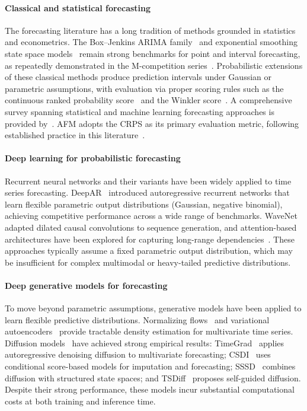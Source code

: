 \documentclass[a4paper,10pt,twocolumn,preprint,3p]{elsarticle}
\begin{document}
{\color{red}
\paragraph{Classical and statistical forecasting}
The forecasting literature has a long tradition of methods grounded in statistics and econometrics. The Box--Jenkins ARIMA family~\citep{Box1994Timeseries} and exponential smoothing state space models~\citep{hyndman2008forecasting} remain strong benchmarks for point and interval forecasting, as repeatedly demonstrated in the M-competition series~\citep{makridakis2020m4}. Probabilistic extensions of these classical methods produce prediction intervals under Gaussian or parametric assumptions, with evaluation via proper scoring rules such as the continuous ranked probability score~\citep{gneiting2007strictly} and the Winkler score~\citep{winkler1996scoring}. A comprehensive survey spanning statistical and machine learning forecasting approaches is provided by~\citet{petropoulos2022forecasting}. AFM adopts the CRPS as its primary evaluation metric, following established practice in this literature~\citep{hyndman2006another}.

\paragraph{Deep learning for probabilistic forecasting}
Recurrent neural networks and their variants have been widely applied to time series forecasting. DeepAR~\citep{salinas2020deepar} introduced autoregressive recurrent networks that learn flexible parametric output distributions (Gaussian, negative binomial), achieving competitive performance across a wide range of benchmarks. WaveNet~\citep{van2016wavenet} adapted dilated causal convolutions to sequence generation, and attention-based architectures have been explored for capturing long-range dependencies~\citep{Lim2021Timeseries}. These approaches typically assume a fixed parametric output distribution, which may be insufficient for complex multimodal or heavy-tailed predictive distributions.

\paragraph{Deep generative models for forecasting}
To move beyond parametric assumptions, generative models have been applied to learn flexible predictive distributions. Normalizing flows~\citep{rasul2020multivariate} and variational autoencoders~\citep{desai2021timevae,karl2016deep} provide tractable density estimation for multivariate time series. Diffusion models~\citep{ho2020denoising,song2020score} have achieved strong empirical results: TimeGrad~\citep{rasul2021autoregressive} applies autoregressive denoising diffusion to multivariate forecasting; CSDI~\citep{tashiro2021csdi} uses conditional score-based models for imputation and forecasting; SSSD~\citep{alcaraz2022diffusion} combines diffusion with structured state spaces; and TSDiff~\citep{kollovieh2023predict} proposes self-guided diffusion. Despite their strong performance, these models incur substantial computational costs at both training and inference time.

}
\end{document}

